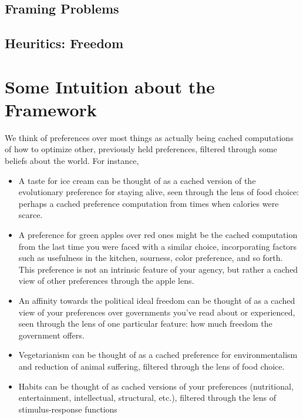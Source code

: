 \documentclass{article}
\theoremstyle{plain}
\theoremstyle{definition}
\theoremstyle{remark}
\begin{document}
	\subsection{Framing Problems}
	\subsection{Heuritics: Freedom}
	
					


	

	\section{Some Intuition about the Framework}
	We think of preferences over most things as actually being cached computations of how to optimize other, previously held preferences, filtered through some beliefs about the world. For instance, 
	
	\begin{itemize}[nosep]
		\item A taste for ice cream can be thought of as a cached version of the evolutionary preference for staying alive, seen through the lens of food choice: perhaps a cached preference computation from times when calories were scarce.
		\item A preference for green apples over red ones might be the cached computation from the last time you were faced with a similar choice, incorporating factors such as usefulness in the kitchen, sourness, color preference, and so forth. This preference is not an intrinsic feature of your agency, but rather a cached view of other preferences through the apple lens.
		\item An affinity towards the political ideal freedom can be thought of as a cached view of your preferences over governments you've read about or experienced, seen through the lens of one particular feature: how much freedom the government offers.
		\item Vegetarianism can be thought of as a cached preference for environmentalism and reduction of animal suffering, filtered through the lens of food choice.
		\item Habits can be thought of as cached versions of your preferences (nutritional, entertainment, intellectual, structural, etc.), filtered through the lens of stimulus-response functions
	\end{itemize}
	
\end{document}
